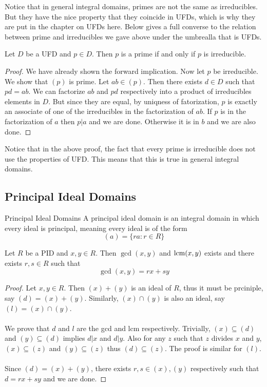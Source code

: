 \documentclass[a4paper]{article}
\begin{document}
Notice that in general integral domains, primes are not the same as irreducibles. But they have the nice property that they coincide in UFDs, which is why they are put in the chapter on UFDs here. Below gives a full converse to the relation between prime and irreducibles we gave above under the umbrealla that is UFDs. 

\begin{prp}{}{} Let $D$ be a UFD and $p\in D$. Then $p$ is a prime if and only if $p$ is irreducible. \tcbline
\begin{proof}
We have already shown the forward implication. Now let $p$ be irreducible. We show that $(p)$ is prime. Let $ab\in(p)$. Then there exists $d\in D$ such that $pd=ab$. We can factorize $ab$ and $pd$ respectively into a product of irreducibles elements in $D$. But since they are equal, by uniqness of fatorization, $p$ is exactly an associate of one of the irreducibles in the factorization of $ab$. If $p$ is in the factorization of $a$ then $p|a$ and we are done. Otherwise it is in $b$ and we are also done. 
\end{proof}
\end{prp}

Notice that in the above proof, the fact that every prime is irreducible does not use the properties of UFD. This means that this is true in general integral domains. 

\subsection{Principal Ideal Domains}
\begin{defn}{Principal Ideal Domains}{} A principal ideal domain is an integral domain in which every ideal is principal, meaning every ideal is of the form $$(a)=\{ra:r\in R\}$$
\end{defn}

\begin{prp}{}{} Let $R$ be a PID and $x,y\in R$. Then $\gcd(x,y)$ and $\operatorname{lcm}(x,y)$ exists and there exists $r,s\in R$ such that $$\gcd(x,y)=rx+sy$$ \tcbline
\begin{proof}
Let $x,y\in R$. Then $(x)+(y)$ is an ideal of $R$, thus it must be prciniple, say $(d)=(x)+(y)$. Similarly, $(x)\cap(y)$ is also an ideal, say $(l)=(x)\cap(y)$. \\~\\
We prove that $d$ and $l$ are the gcd and lcm respectively. Trivially, $(x)\subseteq(d)$ and $(y)\subseteq(d)$ implies $d|x$ and $d|y$. Also for any $z$ such that $z$ divides $x$ and $y$, $(x)\subseteq(z)$ and $(y)\subseteq(z)$ thus $(d)\subseteq(z)$. The proof is similar for $(l)$. \\~\\
Since $(d)=(x)+(y)$, there exists $r,s\in (x),(y)$ respectively such that $d=rx+sy$ and we are done. 
\end{proof}
\end{prp}
\end{document}
